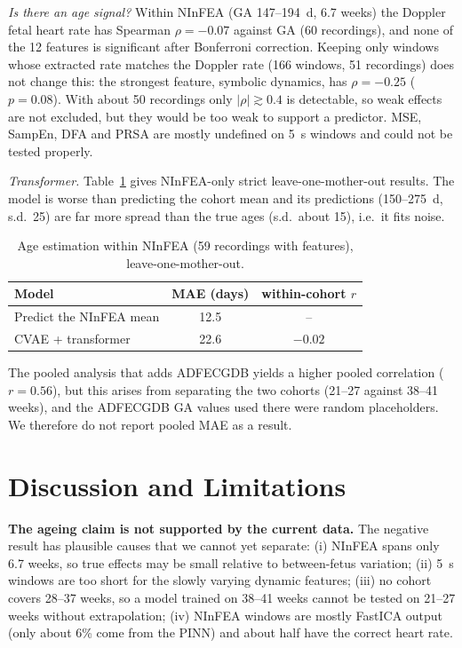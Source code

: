 \documentclass[journal]{IEEEtran}
\begin{document}
\emph{Is there an age signal?} Within NInFEA (GA 147--194~d, 6.7 weeks) the Doppler fetal heart rate has Spearman $\rho=-0.07$ against GA (60 recordings), and none of the 12 features is significant after Bonferroni correction. Keeping only windows whose extracted rate matches the Doppler rate (166 windows, 51 recordings) does not change this: the strongest feature, symbolic dynamics, has $\rho=-0.25$ ($p=0.08$). With about 50 recordings only $|\rho|\gtrsim0.4$ is detectable, so weak effects are not excluded, but they would be too weak to support a predictor. MSE, SampEn, DFA and PRSA are mostly undefined on 5~s windows and could not be tested properly.

\emph{Transformer.} Table~\ref{tab:age} gives NInFEA-only strict leave-one-mother-out results. The model is worse than predicting the cohort mean and its predictions (150--275~d, s.d.\ 25) are far more spread than the true ages (s.d.\ about 15), i.e.\ it fits noise.

\begin{table}[!t]
\caption{Age estimation within NInFEA (59 recordings with features), leave-one-mother-out.}
\label{tab:age}
\centering
\small
\begin{tabular}{@{}lcc@{}}
\toprule
Model & MAE (days) & within-cohort $r$ \\
\midrule
Predict the NInFEA mean & 12.5 & -- \\
CVAE + transformer & 22.6 & $-0.02$ \\
\bottomrule
\end{tabular}
\end{table}

The pooled analysis that adds ADFECGDB yields a higher pooled correlation ($r=0.56$), but this arises from separating the two cohorts (21--27 against 38--41 weeks), and the ADFECGDB GA values used there were random placeholders. We therefore do not report pooled MAE as a result.

\section{Discussion and Limitations}
\textbf{The ageing claim is not supported by the current data.} The negative result has plausible causes that we cannot yet separate: (i) NInFEA spans only 6.7 weeks, so true effects may be small relative to between-fetus variation; (ii) 5~s windows are too short for the slowly varying dynamic features; (iii) no cohort covers 28--37 weeks, so a model trained on 38--41 weeks cannot be tested on 21--27 weeks without extrapolation; (iv) NInFEA windows are mostly FastICA output (only about 6\% come from the PINN) and about half have the correct heart rate.
\end{document}
